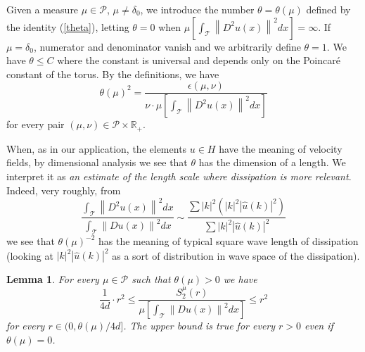 \documentclass[11pt]{preprint}
\newtheorem{lemma}[theorem]{Lemma}
\begin{document}
Given a measure $\mu\in\mathcal{P}$, $\mu\neq\delta_{0}$, we introduce the
number $\theta=\theta\left(  \mu\right)  $ defined by the identity
(\ref{theta}), letting $\theta=0$ when $\mu\left[
\int_{\mathcal{T}}\left\|  D^{2}u\left(  x\right)  \right\|
^{2}dx\right]  =\infty$. If $\mu=\delta_{0}$, numerator and denominator vanish
and we arbitrarily define $\theta=1$. We have $\theta\leq C$ where the
constant is universal and depends only on the Poincar\'{e}
constant of the torus. By the definitions, we have
\[
\theta\left(  \mu\right)  ^{2}=\frac{\epsilon\left(  \mu,\nu\right)  }%
{\nu\cdot\mu\left[  \int_{\mathcal{T}}\left\|  D^{2}u\left(  x\right)
\right\|  ^{2}dx\right]  }%
\]
for every pair $\left(  \mu,\nu\right)  \in\mathcal{P}\times\mathbb{R}_{+}$.

When, as in our application, the elements $u\in H$ have the meaning of
velocity fields, by dimensional analysis we see that $\theta$ has the
dimension of a length. We interpret it as \textit{an} \textit{estimate of the
length scale where dissipation is more relevant}. Indeed, very roughly, from
\[
\frac{\int_{\mathcal{T}}\left\|  D^{2}u\left(  x\right)  \right\|  ^{2}%
dx}{\int_{\mathcal{T}}\left\|  Du\left(  x\right)  \right\|  ^{2}dx}\sim
\frac{\sum\left|  k\right|  ^{2}\left(  \left|  k\right|  ^{2}\left|
\widehat{u}\left(  k\right)  \right|  ^{2}\right)  }{\sum\left|  k\right|
^{2}\left|  \widehat{u}\left(  k\right)  \right|  ^{2}}%
\]
we see that $\theta\left(  \mu\right)  ^{-2}$ has the meaning of typical
square wave length of dissipation (looking at $\left|  k\right|  ^{2}\left|
\widehat{u}\left(  k\right)  \right|  ^{2}$ as a sort of distribution in wave
space of the dissipation).

\begin{lemma}
\label{lemmaTaylor}For every $\mu\in\mathcal{P}$ such that $\theta\left(
\mu\right)  >0$ we have
\begin{equation}
\frac{1}{4d}\cdot r^{2}\leq\frac{S_{2}^{\mu}\left(  r\right)  }{\mu\left[
\int_{\mathcal{T}}\left\|  Du\left(  x\right)  \right\|  ^{2}dx\right]  }\leq
r^{2}\label{double inequality from Taylor}%
\end{equation}
for every $r\in(0,\theta(\mu)/{4d}]$. The upper bound is true for every $r > 0$ even if $\theta(\mu) = 0$.
\end{lemma}
\end{document}
